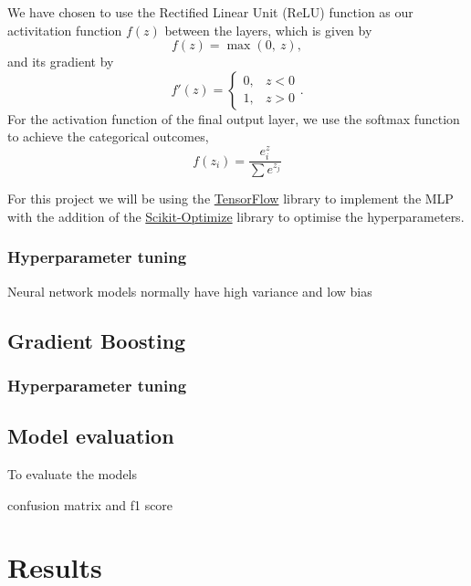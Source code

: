 \documentclass[a4paper, 11pt, twocolumn]{article}
\begin{document}
We have chosen to use the Rectified Linear Unit (ReLU) function as our 
activitation function $f(z)$ between the layers, which is given by 
\begin{equation}
      f(z) = \max (0,\ z),
\end{equation}
and its gradient by 
\begin{equation}
      f'(z) = 
      \begin{cases} 
            0, &  z<0\\
            1, &  z>0
      \end{cases}. 
\end{equation}
For the activation function of the final output layer, we use the softmax 
function to achieve the categorical outcomes,
\begin{equation}
      f(z_i)=\frac{e^z_i}{\sum e^{z_j}}
\end{equation}

For this project we will be using the \href{https://www.tensorflow.org/}
{TensorFlow} library to implement the MLP with the addition of the 
\href{https://scikit-optimize.github.io/}{Scikit-Optimize} library to optimise 
the hyperparameters.

\subsubsection{Hyperparameter tuning}
Neural network models normally have high variance and low bias


\subsection{Gradient Boosting}
\subsubsection{Hyperparameter tuning}


\subsection{Model evaluation}
To evaluate the models 

confusion matrix and f1 score

\section{Results}

\begin{table}
\centering
{}
\caption{Estimated hyperparameters for the neural network model employed in this project.}
\label{tab:Tune_NN}
\end{table}
\end{document}
